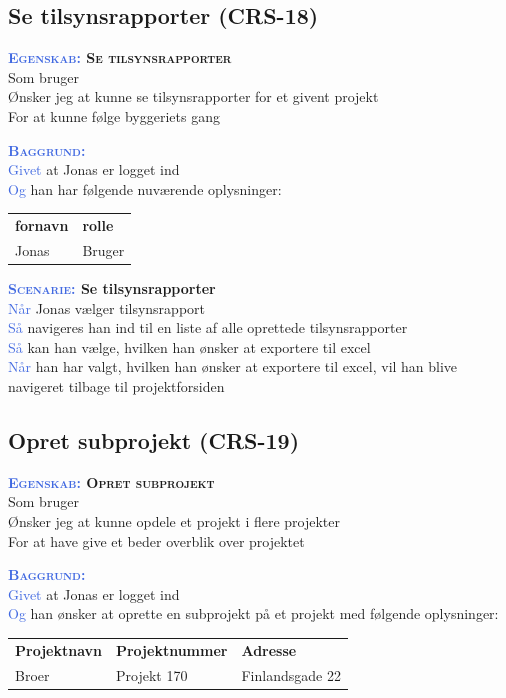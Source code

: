 \subsection{Se tilsynsrapporter (CRS-18)} \label{sec:USTilsynsrapport}
\textbf{\textsc{\textcolor{RoyalBlue}{Egenskab:} Se tilsynsrapporter}}\\
Som bruger\\
Ønsker jeg at kunne se tilsynsrapporter for et givent projekt\\
For at kunne følge byggeriets gang

\textsc{\textcolor{RoyalBlue}{\textbf{Baggrund:}}}\\
\textcolor{RoyalBlue}{Givet} at Jonas er logget ind\\
\textcolor{RoyalBlue}{Og} han har følgende nuværende oplysninger:\\
\begin{tabular}{| l | l |}
	\textbf{fornavn} & \textbf{rolle} \\
	Jonas & Bruger\\
\end{tabular}
\newline

\clearpage

\textbf{\textsc{\textcolor{RoyalBlue}{Scenarie:}} Se tilsynsrapporter}\\
\textcolor{RoyalBlue}{Når} Jonas vælger tilsynsrapport\\
\textcolor{RoyalBlue}{Så} navigeres han ind til en liste af alle oprettede tilsynsrapporter\\
\textcolor{RoyalBlue}{Så} kan han vælge, hvilken han ønsker at exportere til excel\\
\textcolor{RoyalBlue}{Når} han har valgt, hvilken han ønsker at exportere til excel, vil han blive navigeret tilbage til projektforsiden\\

\subsection{Opret subprojekt (CRS-19)} \label{sec:USOpretSubEntreprise}
\textbf{\textsc{\textcolor{RoyalBlue}{Egenskab:} Opret subprojekt}}\\
Som bruger \\
Ønsker jeg at kunne opdele et projekt i flere projekter \\
For at have give et beder overblik over projektet

\textsc{\textcolor{RoyalBlue}{\textbf{Baggrund:}}}\\
\textcolor{RoyalBlue}{Givet} at Jonas er logget ind\\
\textcolor{RoyalBlue}{Og} han ønsker at oprette en subprojekt på et projekt med følgende oplysninger:\\
\begin{tabular}{| l | l | l |}
	\textbf{Projektnavn} & \textbf{Projektnummer} & \textbf{Adresse} \\
	Broer & Projekt 170 & Finlandsgade 22 
\end{tabular}
\newline

